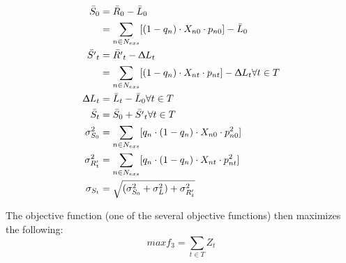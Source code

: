 \documentclass[10pt]{amsart}
\begin{document}
\begin{equation}	
\begin{split}
\bar{S}_{0} &= \bar{R}_{0} - \bar{L}_{0} \\
&= \sum_{n \in N_{exs}} [(1-q_n)\cdot X_{n0} \cdot p_{n0}] - \bar{L}_0 \\
\bar{S'}_{t} &= \bar{R'}_{t} - \Updelta{L}_{t} \\
&= \sum_{n \in N_{exs}} [(1-q_n)\cdot X_{nt} \cdot p_{nt}] - \Updelta{L}_t  \forall t \in T \\
\Updelta{L}_{t} &= \bar{L}_{t} - \bar{L}_{0} \forall t \in T \\
\bar{S}_{t} &= \bar{S}_{0} + \bar{S'}_{t} \forall t \in T \\
\sigma^2_{S_0} &= \sum_{n \in N_{exs}} [q_n \cdot (1-q_n)\cdot X_{n0} \cdot p^2_{n0}] \\
\sigma^2_{R'_t} &= \sum_{n \in N_{exs}} [q_n \cdot (1-q_n)\cdot X_{nt} \cdot p^2_{nt}] \\
\sigma_{S_t} &= \sqrt{(\sigma^2_{S_0} + \sigma^2_{L}) + \sigma^2_{R'_t}}
\end{split}
\end{equation}

The objective function (one of the several objective functions) then maximizes the following: 
\begin{equation}
max f_3 = \sum_{t \in T} Z_t
\end{equation}
\end{document}
